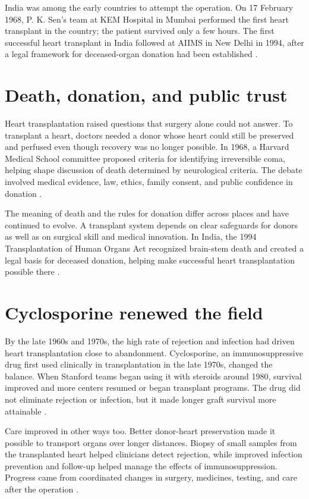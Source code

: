 \documentclass[12pt,oneside]{book}
\begin{document}
India was among the early countries to attempt the operation. On 17 February
1968, P. K. Sen's team at KEM Hospital in Mumbai performed the first heart
transplant in the country; the patient survived only a few hours. The first
successful heart transplant in India followed at AIIMS in New Delhi in 1994,
after a legal framework for deceased-organ donation had been established
\cite{indiaHeartTransplant}.

\section{Death, donation, and public trust}
Heart transplantation raised questions that surgery alone could not answer.
To transplant a heart, doctors needed a donor whose heart could still be
preserved and perfused even though recovery was no longer possible. In 1968,
a Harvard Medical School committee proposed criteria for identifying
irreversible coma, helping shape discussion of death determined by
neurological criteria. The debate involved medical evidence, law, ethics,
family consent, and public confidence in donation \cite{harvardBrainDeath}.

The meaning of death and the rules for donation differ across places and have
continued to evolve. A transplant system depends on clear safeguards for
donors as well as on surgical skill and medical innovation. In India, the
1994 Transplantation of Human Organs Act recognized brain-stem death and
created a legal basis for deceased donation, helping make successful heart
transplantation possible there \cite{indiaHeartTransplant}.

\section{Cyclosporine renewed the field}
By the late 1960s and 1970s, the high rate of rejection and infection had
driven heart transplantation close to abandonment. Cyclosporine, an
immunosuppressive drug first used clinically in transplantation in the late
1970s, changed the balance. When Stanford teams began using it with steroids
around 1980, survival improved and more centers resumed or began transplant
programs. The drug did not eliminate rejection or infection, but it made
longer graft survival more attainable \cite{heartTransplantReview}.

Care improved in other ways too. Better donor-heart preservation made it
possible to transport organs over longer distances. Biopsy of small samples
from the transplanted heart helped clinicians detect rejection, while
improved infection prevention and follow-up helped manage the effects of
immunosuppression. Progress came from coordinated changes in surgery,
medicines, testing, and care after the operation \cite{stanfordHeartHistory}.
\end{document}
